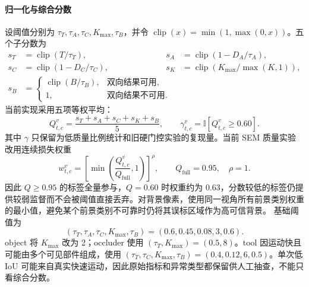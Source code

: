 \documentclass[UTF8,a4paper,11pt]{ctexart}
\begin{document}
\paragraph{归一化与综合分数}
设阈值分别为 $\tau_T,\tau_A,\tau_C,K_{\max},\tau_B$，并令 $\operatorname{clip}(x)=\min(1,\max(0,x))$。五个子分数为
\begin{align}
s_T&=\operatorname{clip}(T/\tau_T), &
s_A&=\operatorname{clip}(1-D_A/\tau_A),\\
s_C&=\operatorname{clip}(1-D_C/\tau_C), &
s_K&=\operatorname{clip}\!\left(K_{\max}/\max(K,1)\right),\\
s_B&=\begin{cases}
\operatorname{clip}(B/\tau_B),&\text{双向结果可用},\\
1,&\text{双向结果不可用}.
\end{cases}
\end{align}
当前实现采用五项等权平均：
\begin{equation}
Q_{t,c}^{v}=\frac{s_T+s_A+s_C+s_K+s_B}{5},\qquad
\gamma_{t,c}^{v}=\mathbb I[Q_{t,c}^{v}\geq0.60].
\end{equation}
其中 $\gamma$ 只保留为低质量比例统计和旧硬门控实验的复现量。当前 SEM 质量实验改用连续损失权重
\begin{equation}
w_{t,c}^{v}=\left[\min\left(\frac{Q_{t,c}^{v}}{Q_{\mathrm{full}}},1\right)\right]^{\rho},
\qquad Q_{\mathrm{full}}=0.95,\quad \rho=1.
\end{equation}
因此 $Q\geq0.95$ 的标签全量参与，$Q=0.60$ 时权重约为 0.63，分数较低的标签仍提供较弱监督而不会被阈值直接丢弃。对背景像素，使用同一视角所有前景类别权重的最小值，避免某个前景类别不可靠时仍将其误标区域作为高可信背景。
基础阈值为
\begin{equation}
(\tau_T,\tau_A,\tau_C,K_{\max},\tau_B)=(0.6,0.45,0.08,3,0.6).
\end{equation}
object 将 $K_{\max}$ 改为 2；occluder 使用 $(\tau_T,K_{\max})=(0.5,8)$。tool 因运动快且可能由多个可见部件组成，使用 $(\tau_T,\tau_C,K_{\max},\tau_B)=(0.4,0.12,6,0.5)$。单次低 IoU 可能来自真实快速运动，因此原始指标和异常类型都保留供人工抽查，不能只看综合分数。
\end{document}
